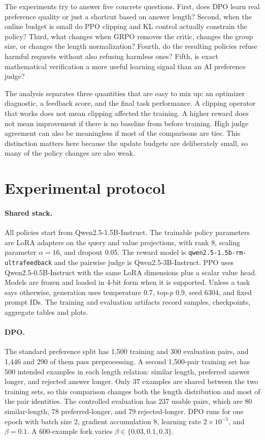 \documentclass{article}
\begin{document}
The experiments try to answer five concrete questions. First, does DPO learn real preference quality or just a shortcut based on answer length? Second, when the online budget is small do PPO clipping and KL control actually constrain the policy? Third, what changes when GRPO removes the critic, changes the group size, or changes the length normalization? Fourth, do the resulting policies refuse harmful requests without also refusing harmless ones? Fifth, is exact mathematical verification a more useful learning signal than an AI preference judge?

The analysis separates three quantities that are easy to mix up: an optimizer diagnostic, a feedback score, and the final task performance. A clipping operator that works does not mean clipping affected the training. A higher reward does not mean improvement if there is no baseline from before training. High judge agreement can also be meaningless if most of the comparisons are ties. This distinction matters here because the update budgets are deliberately small, so many of the policy changes are also weak.

\section{Experimental protocol}
\paragraph{Shared stack.}
All policies start from Qwen2.5-1.5B-Instruct. The trainable policy parameters are LoRA adapters on the query and value projections, with rank 8, scaling parameter $\alpha=16$, and dropout 0.05. The reward model is \texttt{qwen2.5-1.5b-rm-ultrafeedback} and the pairwise judge is Qwen2.5-3B-Instruct. PPO uses Qwen2.5-0.5B-Instruct with the same LoRA dimensions plus a scalar value head. Models are frozen and loaded in 4-bit form when it is supported. Unless a task says otherwise, generation uses temperature 0.7, top-$p$ 0.9, seed 6304, and fixed prompt IDs. The training and evaluation artifacts record samples, checkpoints, aggregate tables and plots.

\paragraph{DPO.}
The standard preference split has 1,500 training and 300 evaluation pairs, and 1,446 and 290 of them pass preprocessing. A second 1,500-pair training set has 500 intended examples in each length relation: similar length, preferred answer longer, and rejected answer longer. Only 37 examples are shared between the two training sets, so this comparison changes both the length distribution and most of the pair identities. The controlled evaluation has 237 usable pairs, which are 80 similar-length, 78 preferred-longer, and 79 rejected-longer. DPO runs for one epoch with batch size 2, gradient accumulation 8, learning rate $2\times10^{-5}$, and $\beta=0.1$. A 600-example fork varies $\beta\in\{0.03,0.1,0.3\}$.
\end{document}
